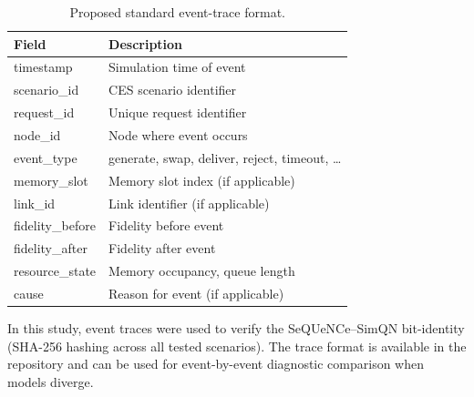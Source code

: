 \documentclass{ams-journal}
\begin{document}
\begin{table}[t]
\centering
\caption{Proposed standard event-trace format.}
\label{tab:trace}
\begin{tabular}{ll}
\toprule
Field & Description \\
\midrule
timestamp & Simulation time of event \\
scenario\_id & CES scenario identifier \\
request\_id & Unique request identifier \\
node\_id & Node where event occurs \\
event\_type & generate, swap, deliver, reject, timeout, \ldots \\
memory\_slot & Memory slot index (if applicable) \\
link\_id & Link identifier (if applicable) \\
fidelity\_before & Fidelity before event \\
fidelity\_after & Fidelity after event \\
resource\_state & Memory occupancy, queue length \\
cause & Reason for event (if applicable) \\
\bottomrule
\end{tabular}
\end{table}

In this study, event traces were used to verify the SeQUeNCe--SimQN bit-identity (SHA-256 hashing across all tested scenarios). The trace format is available in the repository and can be used for event-by-event diagnostic comparison when models diverge.



\end{document}
